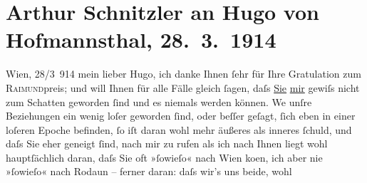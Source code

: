 

         
         \renewcommand{\erwaehntePersonen}{Personen: Hugo von Hofmannsthal}
         \renewcommand{\erwaehnteInstitutionen}{Institutionen: Raimund-Preis}
         \renewcommand{\erwaehnteOrte}{Orte: Rodaun, Semmering, Wien}
         \renewcommand{\erwaehnteWerke}{Werke: Die Frau ohne Schatten. Erzählung}
               \section[Arthur Schnitzler an Hugo von Hofmannsthal, 28. 3. 1914]{ Arthur Schnitzler an Hugo von Hofmannsthal, 28. 3. 1914}\nopagebreak{}\rehead{ }\begin{ledgroupsized}[t]{13cm}\normalsize\beginnumbering{} \toendnotes[C]{\smallbreak\pagebreak[2]} 
\toendnotes[C]{\smallbreak}\pstart
           \raggedleft{}{\pb}Wien, 28/3 914\pend
           \pstart
           mein lieber Hugo, ich danke Ihnen ſehr für Ihre Gratulation zum \textsc{Raimund}preis; und will Ihnen für alle Fälle gleich
               ſagen, daſs \uline{Sie}{ }\uline{mir} gewiſs nicht zum Schatten geworden ſind und es
               niemals werden können. We{\geminationn} unſre Beziehungen ein wenig
               loſer geworden ſind, oder beſſer geſagt, ſich \introOben{}eben\introOben{} in einer
               loſeren Epoche befinden, ſo iſt daran wohl mehr äußeres als inneres ſchuld,  und daſs Sie eher geneigt ſind, nach mir zu rufen als ich nach Ihnen liegt
               wohl hauptſächlich daran, daſs Sie oft »ſowieſo« nach Wien ko{\geminationm}en, ich aber nie »ſowieſo« nach Rodaun – ferner daran: daſs wir’s uns beide, wohl

\end{ledgroupsized}
